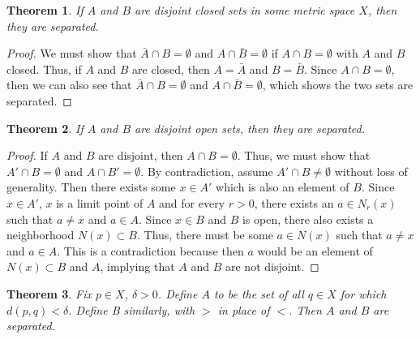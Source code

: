 \documentclass[psamsfonts]{amsart}
\newtheorem{thm}{Theorem}[section]
\theoremstyle{definition}
\theoremstyle{remark}
\numberwithin{equation}{section}
\begin{document}
\begin{thm}
If $A$ and $B$ are disjoint closed sets in some metric space $X$, then they are separated.
\end{thm}

\begin{proof}
We must show that $\bar{A} \cap B = \emptyset$ and $A \cap \bar{B} = \emptyset$ if $A \cap B = \emptyset$ with $A$ and $B$ closed. Thus, if $A$ and $B$ are closed, then $A = \bar{A}$ and $B = \bar{B}$. Since $A \cap B = \emptyset$, then we can also see that $\bar{A} \cap B = \emptyset$ and $A \cap \bar{B} = \emptyset$, which shows the two sets are separated.
\end{proof}

\begin{thm}
If $A$ and $B$ are disjoint open sets, then they are separated.
\end{thm}

\begin{proof}
If $A$ and $B$ are disjoint, then $A \cap B = \emptyset$. Thus, we must show that $A' \cap B = \emptyset$ and $A \cap B' = \emptyset$. By contradiction, assume $A' \cap B \neq \emptyset$ without loss of generality. Then there exists some $x \in A'$ which is also an element of $B$. Since $x \in A'$, $x$ is a limit point of $A$ and for every $r>0$, there exists an $a \in N_r(x)$ such that $a \neq x$ and $a \in A$. Since $x \in B$ and $B$ is open, there also exists a neighborhood $N(x) \subset B$. Thus, there must be some $a \in N(x)$ such that $a \neq x$ and $a \in A$. This is a contradiction because then $a$ would be an element of $N(x) \subset B$ and $A$, implying that $A$ and $B$ are not disjoint.
\end{proof}

\begin{thm}
Fix $p \in X$, $\delta > 0$. Define $A$ to be the set of all $q \in X$ for which $d(p,q) < \delta$. Define B similarly, with $>$ in place of $<$. Then $A$ and $B$ are separated.
\end{thm}
\end{document}
